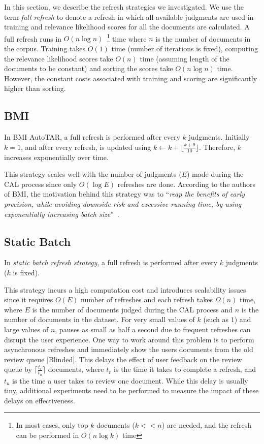In this section, we describe the refresh strategies we investigated. We use the
term \textit{full refresh} to denote a refresh in which all available judgments
are used in training and relevance likelihood scores for all the documents are
calculated. A full refresh runs in $O(n\log n)$~\footnote{In most cases, only
    top $k$ documents ($k<<n$) are needed, and the refresh can be performed in $O(n \log k)$ time} time where $n$ is the
number of documents in the corpus. Training takes $O(1)$ time (number of iterations
is fixed), computing the relevance likelihood scores take $O(n)$ time (assuming
length of
the documents to be constant) and sorting the scores take $O(n \log n)$ time. However,
the constant costs associated with training and scoring are significantly higher
than sorting.

\subsection*{BMI}

In BMI AutoTAR, a full refresh is performed after every $k$ judgments. Initially $k=1$, and
after every refresh, is updated using $k \leftarrow k + \lfloor\frac{k +
9}{10}\rfloor$. Therefore, $k$ increases exponentially over time.

This strategy scales well with the number of judgments ($E$) made during the CAL
process since only $O(\log E)$ refreshes are done. According to the authors of
BMI, the motivation behind this strategy was to ``\textit{reap the benefits of
    early precision, while avoiding downside risk and excessive running time, by
using exponentially increasing batch size}''~\cite{cormack2015autonomy}.


\subsection*{Static Batch}

In \textit{static batch refresh strategy}, a full refresh is performed after every $k$ judgments ($k$ is fixed).

This strategy incurs a high computation cost and introduces scalability issues
since it requires $O(E)$ number of refreshes and each refresh takes $\Omega(n)$
time, where $E$ is the number of documents judged during the CAL process and
$n$ is the number of documents in the dataset. For very small values of $k$
(such as $1$) and large values of $n$, pauses as small as half a second due to
frequent refreshes can disrupt the user experience. One way to work around this
problem is to perform asynchronous refreshes and immediately show the users
documents from the old review queue [Blinded]. This delays the effect of user
feedback on the review queue by $\lceil\frac{t_r}{t_u}\rceil$ documents, where
$t_r$ is the time it takes to complete a refresh, and $t_u$ is the time a user
takes to review one document. While this delay is usually tiny, additional
experiments need to be performed to measure the impact of these delays on
effectiveness.

